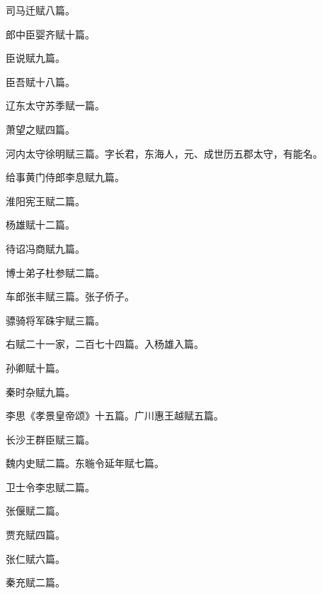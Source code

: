 \documentclass[12pt,UTF8]{ctexbook}
\begin{document}
司马迁赋八篇。



郎中臣婴齐赋十篇。



臣说赋九篇。



臣吾赋十八篇。



辽东太守苏季赋一篇。



萧望之赋四篇。



河内太守徐明赋三篇。字长君，东海人，元、成世历五郡太守，有能名。



给事黄门侍郎李息赋九篇。



淮阳宪王赋二篇。



杨雄赋十二篇。



待诏冯商赋九篇。



博士弟子杜参赋二篇。



车郎张丰赋三篇。张子侨子。



骠骑将军硃宇赋三篇。



右赋二十一家，二百七十四篇。入杨雄入篇。



孙卿赋十篇。



秦时杂赋九篇。



李思《孝景皇帝颂》十五篇。广川惠王越赋五篇。



长沙王群臣赋三篇。



魏内史赋二篇。东暆令延年赋七篇。



卫士令李忠赋二篇。



张偃赋二篇。



贾充赋四篇。



张仁赋六篇。



秦充赋二篇。
\end{document}
